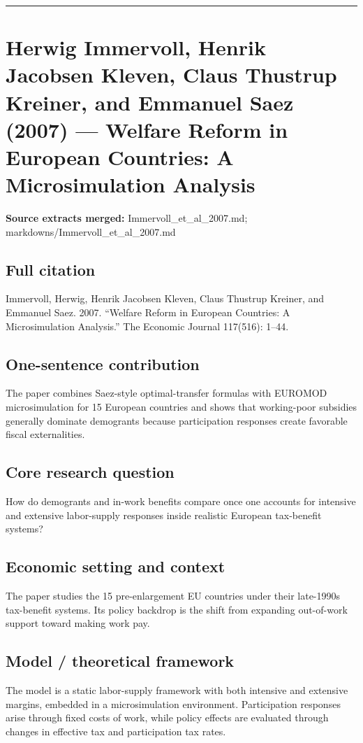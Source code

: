 \documentclass[11pt,a4paper]{article}
\begin{document}
\medskip\hrule\medskip

\section*{Herwig Immervoll, Henrik Jacobsen Kleven, Claus Thustrup Kreiner, and Emmanuel Saez (2007) — Welfare Reform in European Countries: A Microsimulation Analysis}

\textbf{Source extracts merged:} Immervoll\_et\_al\_2007.md; markdowns/Immervoll\_et\_al\_2007.md

\subsection*{Full citation}
Immervoll, Herwig, Henrik Jacobsen Kleven, Claus Thustrup Kreiner, and Emmanuel Saez. 2007. “Welfare Reform in European Countries: A Microsimulation Analysis.” The Economic Journal 117(516): 1–44.

\subsection*{One-sentence contribution}
The paper combines Saez-style optimal-transfer formulas with EUROMOD microsimulation for 15 European countries and shows that working-poor subsidies generally dominate demogrants because participation responses create favorable fiscal externalities.

\subsection*{Core research question}
How do demogrants and in-work benefits compare once one accounts for intensive and extensive labor-supply responses inside realistic European tax-benefit systems?

\subsection*{Economic setting and context}
The paper studies the 15 pre-enlargement EU countries under their late-1990s tax-benefit systems. Its policy backdrop is the shift from expanding out-of-work support toward making work pay.

\subsection*{Model / theoretical framework}
The model is a static labor-supply framework with both intensive and extensive margins, embedded in a microsimulation environment. Participation responses arise through fixed costs of work, while policy effects are evaluated through changes in effective tax and participation tax rates.
\end{document}
